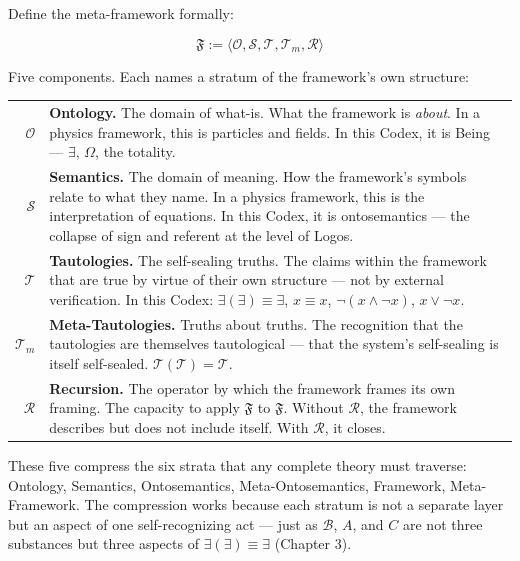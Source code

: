 \documentclass[10pt, openany, oneside]{book}
\renewcommand{\footnotesize}{\fontsize{8.5}{11}\selectfont}
\begin{document}
\vspace{1em}

\noindent Define the meta-framework formally:

$$\mathfrak{F} := \langle \mathcal{O}, \mathcal{S}, \mathcal{T}, \mathcal{T}_m, \mathcal{R} \rangle$$

Five components. Each names a stratum of the framework's own structure:

\vspace{0.5em}

{\footnotesize
\noindent\begin{tabular}{r p{}}
$\mathcal{O}$ & \textbf{Ontology.} The domain of what-is. What the framework is \textit{about}. In a physics framework, this is particles and fields. In this Codex, it is Being --- $\exists$, $\Omega$, the totality. \\[0.3em]
$\mathcal{S}$ & \textbf{Semantics.} The domain of meaning. How the framework's symbols relate to what they name. In a physics framework, this is the interpretation of equations. In this Codex, it is ontosemantics --- the collapse of sign and referent at the level of Logos. \\[0.3em]
$\mathcal{T}$ & \textbf{Tautologies.} The self-sealing truths. The claims within the framework that are true by virtue of their own structure --- not by external verification. In this Codex: $\exists(\exists) \equiv \exists$, $x \equiv x$, $\neg(x \wedge \neg x)$, $x \vee \neg x$. \\[0.3em]
$\mathcal{T}_m$ & \textbf{Meta-Tautologies.} Truths about truths. The recognition that the tautologies are themselves tautological --- that the system's self-sealing is itself self-sealed. $\mathcal{T}(\mathcal{T}) = \mathcal{T}$. \\[0.3em]
$\mathcal{R}$ & \textbf{Recursion.} The operator by which the framework frames its own framing. The capacity to apply $\mathfrak{F}$ to $\mathfrak{F}$. Without $\mathcal{R}$, the framework describes but does not include itself. With $\mathcal{R}$, it closes. \\[0.3em]
\end{tabular}
}

\vspace{0.8em}

\noindent These five compress the six strata that any complete theory must traverse: Ontology, Semantics, Ontosemantics, Meta-Ontosemantics, Framework, Meta-Framework. The compression works because each stratum is not a separate layer but an aspect of one self-recognizing act --- just as $\mathcal{B}$, $A$, and $C$ are not three substances but three aspects of $\exists(\exists) \equiv \exists$ (Chapter 3).
\end{document}

